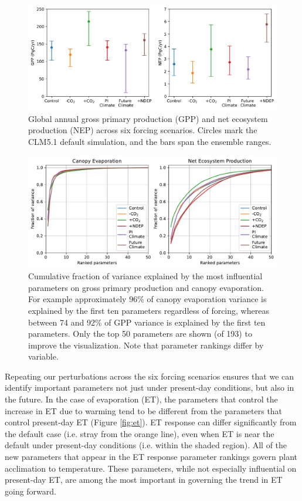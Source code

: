 \documentclass[draft]{agujournal2019}
\begin{document}
\begin{figure}[h]
\centering
\includegraphics[width=\textwidth]{../figs/ranges.png}
\caption{Global annual gross primary production (GPP) and net ecosystem production (NEP) across six forcing scenarios. Circles mark the CLM5.1 default simulation, and the bars span the ensemble ranges.}
\label{fig:ranges}
\end{figure}

\begin{figure}[h]
\centering
\includegraphics[width=\textwidth]{../figs/variance.pdf}
\caption{Cumulative fraction of variance explained by the most influential parameters on gross primary production and canopy evaporation. For example approximately 96\% of canopy evaporation variance is explained by the first ten parameters regardless of forcing, whereas between 74 and 92\% of GPP variance is explained by the first ten parameters. Only the top 50 parameters are shown (of 193) to improve the visualization. Note that parameter rankings differ by variable.}
\label{fig:variance}
\end{figure}

Repeating our perturbations across the six forcing scenarios ensures that we can identify important parameters not just under present-day conditions, but also in the future. In the case of evaporation (ET), the parameters that control the increase in ET due to warming tend to be different from the parameters that control present-day ET (Figure \ref{fig:et}). 
ET response can differ significantly from the default case (i.e. stray from the orange line), even when ET is near the default under present-day conditions (i.e. within the shaded region).
All of the new parameters that appear in the ET response parameter rankings govern plant acclimation to temperature. 
These parameters, while not especially influential on present-day ET, are among the most important in governing the trend in ET going forward.
\end{document}
